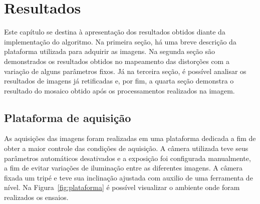 \chapter{Resultados} 

Este capítulo se destina à apresentação dos resultados obtidos diante da implementação do algoritmo. Na primeira seção, há uma breve descrição da plataforma utilizada para adquirir as imagens. Na segunda seção são demonstrados os resultados obtidos no mapeamento das distorções com a variação de alguns parâmetros fixos. Já na terceira seção, é possível analisar os resultados de imagens já retificadas e, por fim, a quarta seção demonstra o resultado do mosaico obtido após os processamentos realizados na imagem.

\section{Plataforma de aquisição}

As aquisições das imagens foram realizadas em uma plataforma dedicada a fim de obter a maior controle das condições de aquisição. A câmera utilizada teve seus parâmetros automáticos desativados e a exposição foi configurada manualmente, a fim de evitar variações de iluminação entre as diferentes imagens. A câmera fixada um tripé e teve sua inclinação 
ajustada com auxilio de uma ferramenta de nível. Na Figura~\ref{fig:plataforma} é possível visualizar o ambiente onde foram realizados os ensaios.

